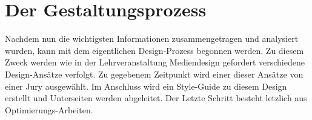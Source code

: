 \chapter{Der Gestaltungsprozess}
Nachdem nun die wichtigsten Informationen zusammengetragen und analysiert wurden, kann mit dem eigentlichen Design-Prozess begonnen werden. Zu diesem Zweck werden wie in der Lehrveranstaltung Mediendesign gefordert verschiedene Design-Ansätze verfolgt. Zu gegebenem Zeitpunkt wird einer dieser Ansätze von einer Jury ausgewählt. Im Anschluss wird ein Style-Guide zu diesem Design erstellt und Unterseiten werden abgeleitet. Der Letzte Schritt besteht letzlich aus Optimierungs-Arbeiten.









